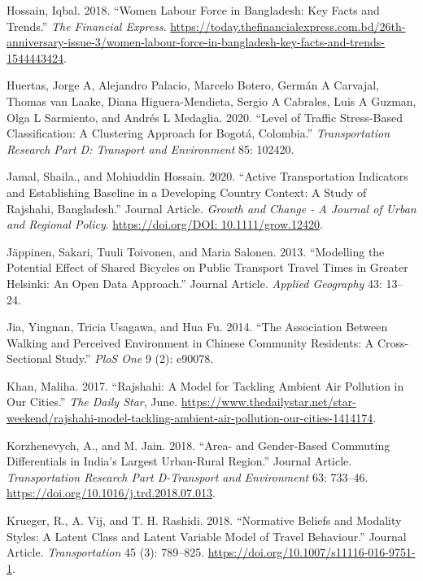 \documentclass[]{elsarticle} %
\begin{document}
\leavevmode\hypertarget{ref-hossain_2018}{}%
Hossain, Iqbal. 2018. ``Women Labour Force in Bangladesh: Key Facts and
Trends.'' \emph{The Financial Express}.
\url{https://today.thefinancialexpress.com.bd/26th-anniversary-issue-3/women-labour-force-in-bangladesh-key-facts-and-trends-1544443424}.

\leavevmode\hypertarget{ref-huertas2020level}{}%
Huertas, Jorge A, Alejandro Palacio, Marcelo Botero, Germán A Carvajal,
Thomas van Laake, Diana Higuera-Mendieta, Sergio A Cabrales, Luis A
Guzman, Olga L Sarmiento, and Andrés L Medaglia. 2020. ``Level of
Traffic Stress-Based Classification: A Clustering Approach for Bogotá,
Colombia.'' \emph{Transportation Research Part D: Transport and
Environment} 85: 102420.

\leavevmode\hypertarget{ref-Jamal2020}{}%
Jamal, Shaila., and Mohiuddin Hossain. 2020. ``Active Transportation
Indicators and Establishing Baseline in a Developing Country Context: A
Study of Rajshahi, Bangladesh.'' Journal Article. \emph{Growth and
Change - A Journal of Urban and Regional Policy}.
\href{https://doi.org/DOI:\%2010.1111/grow.12420\%20}{https://doi.org/DOI: 10.1111/grow.12420}.

\leavevmode\hypertarget{ref-Jappinen2013modelling}{}%
Jäppinen, Sakari, Tuuli Toivonen, and Maria Salonen. 2013. ``Modelling
the Potential Effect of Shared Bicycles on Public Transport Travel Times
in Greater Helsinki: An Open Data Approach.'' Journal Article.
\emph{Applied Geography} 43: 13--24.

\leavevmode\hypertarget{ref-jia2014association}{}%
Jia, Yingnan, Tricia Usagawa, and Hua Fu. 2014. ``The Association
Between Walking and Perceived Environment in Chinese Community
Residents: A Cross-Sectional Study.'' \emph{PloS One} 9 (2): e90078.

\leavevmode\hypertarget{ref-khan_2017}{}%
Khan, Maliha. 2017. ``Rajshahi: A Model for Tackling Ambient Air
Pollution in Our Cities.'' \emph{The Daily Star}, June.
\url{https://www.thedailystar.net/star-weekend/rajshahi-model-tackling-ambient-air-pollution-our-cities-1414174}.

\leavevmode\hypertarget{ref-Korzhenevych2018area}{}%
Korzhenevych, A., and M. Jain. 2018. ``Area- and Gender-Based Commuting
Differentials in India's Largest Urban-Rural Region.'' Journal Article.
\emph{Transportation Research Part D-Transport and Environment} 63:
733--46. \url{https://doi.org/10.1016/j.trd.2018.07.013}.

\leavevmode\hypertarget{ref-Krueger2018normative}{}%
Krueger, R., A. Vij, and T. H. Rashidi. 2018. ``Normative Beliefs and
Modality Styles: A Latent Class and Latent Variable Model of Travel
Behaviour.'' Journal Article. \emph{Transportation} 45 (3): 789--825.
\url{https://doi.org/10.1007/s11116-016-9751-1}.
\end{document}
